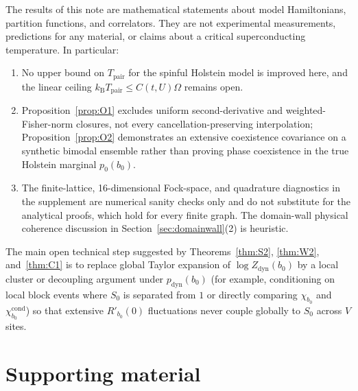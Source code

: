 \documentclass[11pt]{article}
\theoremstyle{definition}
\theoremstyle{remark}
\DeclareMathOperator{\cond}{cond}
\DeclareMathOperator{\dyn}{dyn}
\newcommand{\Tpair}{T_{\mathrm{pair}}}
\newcommand{\kB}{k_{\mathrm{B}}}
\begin{document}
The results of this note are mathematical statements about model Hamiltonians, partition functions, and correlators. They are not experimental measurements, predictions for any material, or claims about a critical superconducting temperature. In particular:
\begin{enumerate}[label=(\alph*),leftmargin=2.2em]
\item No upper bound on $\Tpair$ for the spinful Holstein model is improved here, and the linear ceiling $\kB \Tpair \le C(t,U)\Omega$ remains open.
\item Proposition~\ref{prop:O1} excludes uniform second-derivative and weighted-Fisher-norm closures, not every cancellation-preserving interpolation; Proposition~\ref{prop:O2} demonstrates an extensive coexistence covariance on a synthetic bimodal ensemble rather than proving phase coexistence in the true Holstein marginal $p_0(b_0)$.
\item The finite-lattice, 16-dimensional Fock-space, and quadrature diagnostics in the supplement are numerical sanity checks only and do not substitute for the analytical proofs, which hold for every finite graph. The domain-wall physical coherence discussion in Section~\ref{sec:domainwall}(2) is heuristic.
\end{enumerate}

The main open technical step suggested by Theorems~\ref{thm:S2}, \ref{thm:W2}, and~\ref{thm:C1} is to replace global Taylor expansion of $\log Z_{\dyn}(b_0)$ by a local cluster or decoupling argument under $p_{\dyn}(b_0)$ (for example, conditioning on local block events where $S_0$ is separated from $1$ or directly comparing $\chi_{b_0}$ and $\chi_{b_0}^{\cond}$) so that extensive $R'_{b_0}(0)$ fluctuations never couple globally to $S_0$ across $V$ sites.

\section*{Supporting material}
\end{document}
